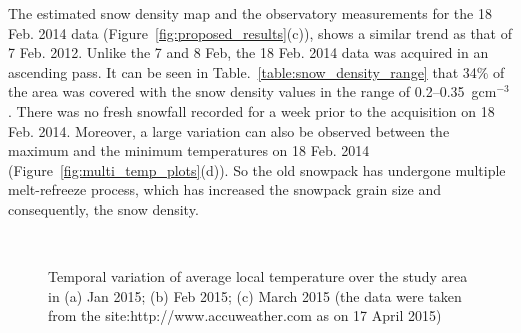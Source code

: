 The estimated snow density map and the observatory measurements for the 18 Feb. 2014 data (Figure~\ref{fig:proposed_results}(c)), shows a similar trend as that of 7 Feb. 2012. Unlike the 7 and 8 Feb, the 18 Feb. 2014 data was acquired in an ascending pass. It can be seen in Table.~\ref{table:snow_density_range} that 34$\%$ of the area was covered with the snow density values in the range of 0.2--0.35~gcm$^{-3}$. There was no fresh snowfall recorded for a week prior to the acquisition on 18 Feb. 2014. Moreover, a large variation can also be observed between the maximum and the minimum temperatures on 18 Feb. 2014 (Figure~\ref{fig:multi_temp_plots}(d)). So the old snowpack has undergone multiple melt-refreeze process, which has increased the snowpack grain size and consequently, the snow density. 

\begin{figure}[!htbp]
	\centering
	 \\
	\caption [Temperature variation plots]{Temporal variation of average local temperature over the study area in (a) Jan 2015; (b) Feb 2015; (c) March 2015 (the data were taken from the site:http://www.accuweather.com as on 17 April 2015)}
	\label{fig:temp_plots_2015}
\end{figure}

